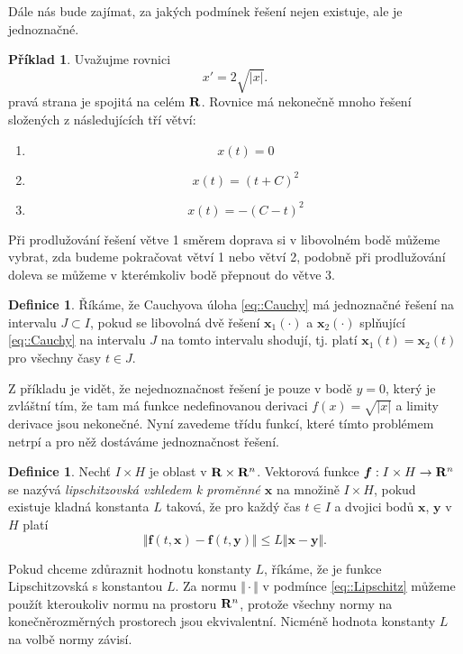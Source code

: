 \documentclass[a4paper, 12pt]{book}
\theoremstyle{definition}
\newtheorem{definition}[theorem]{Definice}
\newtheorem{example}[theorem]{Příklad}
\def\to{\rightarrow}
\def\Real{{\rm\bf R}}
\def\vc#1{\mathbf{\boldsymbol{#1}}}     %
\def\abs#1{\lvert#1\rvert}
\def\norm#1{\bigl\Vert#1\bigr\Vert} %
\def\df#1{\emph{#1}}
\begin{document}
Dále nás bude zajímat, za jakých podmínek řešení nejen existuje, ale je jednoznačné. 
\begin{example}
Uvažujme rovnici
\[
 x' = 2\sqrt{\abs{x}}.
\]
pravá strana je spojitá na celém $\Real$. Rovnice má nekonečně mnoho řešení složených z následujících tří větví:
\begin{enumerate}
 \item \[ x(t)=0\]
 \item \[ x(t)= (t+C)^2 \]
 \item \[ x(t)= -(C-t)^2 \]
\end{enumerate}
Při prodlužování řešení větve 1 směrem doprava si v libovolném bodě můžeme vybrat, zda budeme pokračovat větví 1 nebo větví 2, podobně při prodlužování doleva se můžeme v kterémkoliv bodě 
přepnout do větve 3. 
\end{example}

\begin{definition}
Říkáme, že Cauchyova úloha \eqref{eq::Cauchy}
má jednoznačné řešení na intervalu $J \subset I$, pokud se libovolná dvě řešení $\vc x_1(\cdot)$ a $\vc x_2(\cdot)$
splňující \eqref{eq::Cauchy} na intervalu $J$ na tomto intervalu shodují, tj. platí $\vc x_1(t) = \vc x_2(t)$ pro všechny časy $t\in J$.
\end{definition}

Z příkladu je vidět, že nejednoznačnost řešení je pouze v bodě $y=0$, který je zvláštní tím, že tam má funkce nedefinovanou derivaci $f(x) = \sqrt{\abs{x}}$ 
a limity derivace jsou nekonečné. Nyní zavedeme třídu funkcí, které tímto problémem netrpí a pro něž dostáváme jednoznačnost řešení.
\begin{definition}
Nechť $I\times H$ je oblast v $\Real \times \Real^n$. Vektorová funkce $\vc f:I \times H\to \Real^n$ se
nazývá \df{lipschitzovská vzhledem k proměnné $\vc x$} na množině $I\times H$, pokud existuje kladná konstanta $L$ taková, že
pro každý čas  $t\in I$ a dvojici bodů $\vc x$, $\vc y$ v $H$ platí
\begin{equation}
    \label{eq::Lipschitz}
    \norm{ \vc f(t,\vc x)- \vc f(t,\vc y) } \leq L \norm{ \vc x-\vc y}.
\end{equation}
\end{definition}
Pokud chceme zdůraznit hodnotu konstanty $L$, říkáme, že je funkce Lipschitzovská s konstantou $L$. 
Za normu $\norm{\cdot}$ v podmínce \eqref{eq::Lipschitz} můžeme použít kteroukoliv normu na prostoru $\Real^n$, protože
všechny normy na konečněrozměrných prostorech jsou ekvivalentní. Nicméně hodnota konstanty $L$ na volbě normy závisí.
\end{document}
